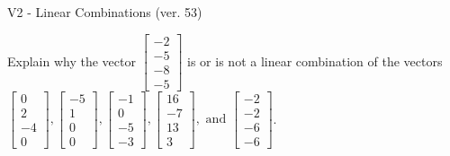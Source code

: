 \begin{exercise}
  \begin{exerciseTitle}V2 - Linear Combinations (ver. 53)\end{exerciseTitle}
  \begin{exerciseStatement}
    Explain why the vector \(\left[\begin{array}{c}
-2 \\
-5 \\
-8 \\
-5
\end{array}\right]\)  is or is not a linear 
	combination of the vectors \(\left[\begin{array}{c}
0 \\
2 \\
-4 \\
0
\end{array}\right] , \left[\begin{array}{c}
-5 \\
1 \\
0 \\
0
\end{array}\right] , \left[\begin{array}{c}
-1 \\
0 \\
-5 \\
-3
\end{array}\right] , \left[\begin{array}{c}
16 \\
-7 \\
13 \\
3
\end{array}\right] , \text{ and } \left[\begin{array}{c}
-2 \\
-2 \\
-6 \\
-6
\end{array}\right]\).
	



\end{exerciseStatement}
\end{exercise}
